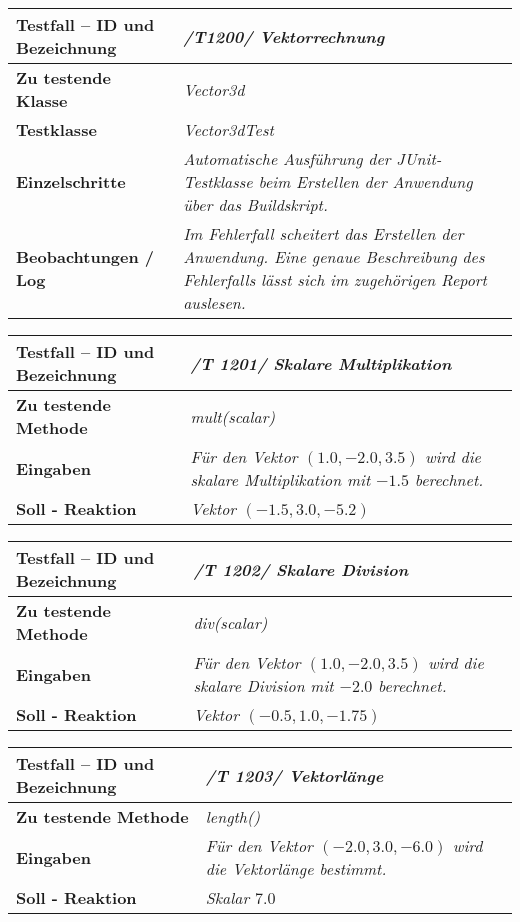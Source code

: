 \begin{longtable}{|p{7cm}|p{10cm}|}
\hline
\textbf{Testfall -- ID und Bezeichnung} &  \textit{/T1200/ Vektorrechnung} \\
\hline
\textbf{Zu testende Klasse} &  \textit{Vector3d} \\
\hline
\textbf{Testklasse} &  \textit{Vector3dTest} \\
\hline
\textbf{Einzelschritte} &  \textit{Automatische Ausführung der JUnit-Testklasse beim Erstellen
der Anwendung über das Buildskript.} \\
\hline
\textbf{Beobachtungen / Log} &  \textit{Im Fehlerfall scheitert das Erstellen der Anwendung.
Eine genaue Beschreibung des Fehlerfalls lässt sich im zugehörigen Report auslesen.} \\
\hline

\end{longtable}

\begin{longtable}{|p{7cm}|p{10cm}|}
\hline
\textbf{Testfall -- ID und Bezeichnung} & \textit{/T 1201/ Skalare Multiplikation} \\
\hline
\textbf{Zu testende Methode} &  \textit{mult(scalar)} \\
\hline
\textbf{Eingaben} & \textit{Für den Vektor $(1.0, -2.0, 3.5)$ wird die skalare
Multiplikation mit $-1.5$ berechnet.}\\
\hline
\textbf{Soll - Reaktion} & \textit{Vektor  $(-1.5, 3.0, -5.2)$} \\
\hline
\end{longtable}

\begin{longtable}{|p{7cm}|p{10cm}|}
\hline
\textbf{Testfall -- ID und Bezeichnung} & \textit{ /T 1202/ Skalare Division} \\
\hline
\textbf{Zu testende Methode} &  \textit{div(scalar)} \\
\hline
\textbf{Eingaben} & \textit{Für den Vektor $(1.0, -2.0, 3.5)$ wird die skalare
Division mit $-2.0$ berechnet.}\\
\hline
\textbf{Soll - Reaktion} & \textit{Vektor  $(-0.5, 1.0, -1.75)$} \\
\hline
\end{longtable}


\begin{longtable}{|p{7cm}|p{10cm}|}
\hline
\textbf{Testfall -- ID und Bezeichnung} & \textit{ /T 1203/ Vektorlänge} \\
\hline
\textbf{Zu testende Methode} &  \textit{length()} \\
\hline
\textbf{Eingaben} & \textit{Für den Vektor $(-2.0, 3.0, -6.0)$ wird die Vektorlänge 
bestimmt.}\\
\hline
\textbf{Soll - Reaktion} & \textit{Skalar $7.0$} \\
\hline
\end{longtable}


